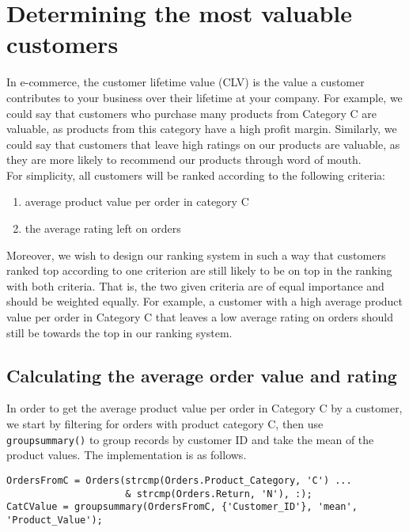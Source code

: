 \newpage
\section{Determining the most valuable customers}
In e-commerce, the customer lifetime value (CLV) is the value a customer contributes to your business over their lifetime at your company. For example, we could say that customers who purchase many products from Category C are valuable, as products from this category have a high profit margin. Similarly, we could say that customers that leave high ratings on our products are valuable, as they are more likely to recommend our products through word of mouth. \\

\noindent
For simplicity, all customers will be ranked according to the following criteria:
\begin{enumerate}[label=(\arabic*)]
  \item average product value per order in category C
  \item the average rating left on orders
\end{enumerate}

\noindent
Moreover, we wish to design our ranking system in such a way that customers ranked top according to one criterion are still likely to be on top in the ranking with both criteria. That is, the two given criteria are of equal importance and should be weighted equally. For example, a customer with a high average product value per order in Category C that leaves a low average rating on orders should still be towards the top in our ranking system.

\subsection{Calculating the average order value and rating}
In order to get the average product value per order in Category C by a customer, we start by filtering for orders with product category C, then use \lstinline|groupsummary()| to group records by customer ID and take the mean of the product values. The implementation is as follows.

\begin{lstlisting}
OrdersFromC = Orders(strcmp(Orders.Product_Category, 'C') ...
                     & strcmp(Orders.Return, 'N'), :);
CatCValue = groupsummary(OrdersFromC, {'Customer_ID'}, 'mean', 'Product_Value');
\end{lstlisting}

